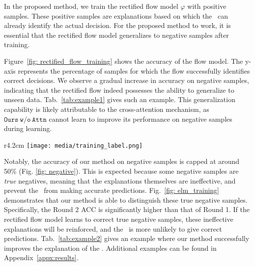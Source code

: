 In the proposed method, we train the rectified flow model $\varphi$ with positive samples. These positive samples are explanations based on which the \rlm~can already identify the actual decision. For the proposed method to work, it is essential that the rectified flow model generalizes to negative samples after training. 

Figure~\ref{fig: rectified_flow_training} shows the accuracy of the flow model. The y-axis represents the percentage of samples for which the flow successfully identifies correct decisions. We observe a gradual increase in accuracy on negative samples, indicating that the rectified flow indeed possesses the ability to generalize to unseen data. Tab.~\ref{tab:example1} gives such an example. This generalization capability is likely attributable to the cross-attention mechanism, as $\mathtt{Ours \ w/o\ Attn}$ cannot learn to improve its performance on negative samples during learning. 

\begin{wrapfigure}{r}{4.2cm}
    \vspace{-1em}
    \texttt{[image: media/training\_label.png]}
    \vspace{-2em}
    \caption{Accuracy of the \elm~increases through each training round.}
 \vspace{-1em}
\label{fig: elm_training}
\end{wrapfigure}
Notably, the accuracy of our method on negative samples is capped at around 50\% (Fig. \ref{fig: negative}). This is expected because some negative samples are \emph{true} negatives, meaning that the explanations themselves are ineffective, and prevent the \rlm~from making accurate predictions. Fig.~\ref{fig: elm_training} demonstrates that our method is able to distinguish these true negative samples. Specifically, the Round 2 ACC is significantly higher than that of Round 1. If the rectified flow model learns to correct true negative samples, these ineffective explanations will be reinforced, and the \rlm~is more unlikely to give correct predictions. Tab.~\ref{tab:example2} gives an example where our method successfully improves the explanation of the \elm. Additional examples can be found in Appendix~\ref{appx:results}.



